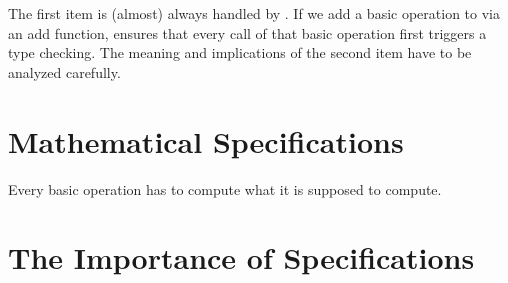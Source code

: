 The first item is (almost) always handled by \CapPkg.
If we add a basic operation to \CapPkg via an add function, \CapPkg ensures that every call of that
basic operation first triggers a type checking. The meaning and implications of the second item have to be analyzed carefully.


\section{Mathematical Specifications}

\begin{specification}
 Every basic operation has to compute what it is supposed to compute.
\end{specification}

\section{The Importance of Specifications}